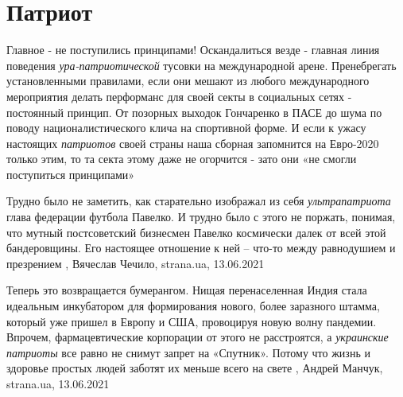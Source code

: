  
 
 
 
 
\chapter{Патриот}
\label{sec:slova.patriot}

Главное - не поступились принципами!  Оскандалиться везде - главная линия
поведения \emph{ура-патриотической} тусовки на международной арене. Пренебрегать
установленными правилами, если они мешают из любого международного мероприятия
делать перформанс для своей секты в социальных сетях - постоянный принцип. От
позорных выходок Гончаренко в ПАСЕ до шума по поводу националистического клича
на спортивной форме.  И если к ужасу настоящих \emph{патриотов} своей страны наша
сборная запомнится на Евро-2020 только этим, то та секта этому даже не
огорчится - зато они «не смогли поступиться принципами»
  


Трудно было не заметить, как старательно изображал из себя \emph{ультрапатриота} глава
федерации футбола Павелко. И трудно было с этого не поржать, понимая, что
мутный постсоветский бизнесмен Павелко космически далек от всей этой
бандеровщины. Его настоящее отношение к ней – что-то между равнодушием и
презрением
,
Вячеслав Чечило, strana.ua, 13.06.2021

Теперь это возвращается бумерангом. Нищая перенаселенная Индия стала идеальным
инкубатором для формирования нового, более заразного штамма, который уже пришел
в Европу и США, провоцируя новую волну пандемии.  Впрочем, фармацевтические
корпорации от этого не расстроятся, а \emph{украинские патриоты} все равно не снимут
запрет на «Спутник». Потому что жизнь и здоровье простых людей заботят их
меньше всего на свете
, 
Андрей Манчук, strana.ua, 13.06.2021

